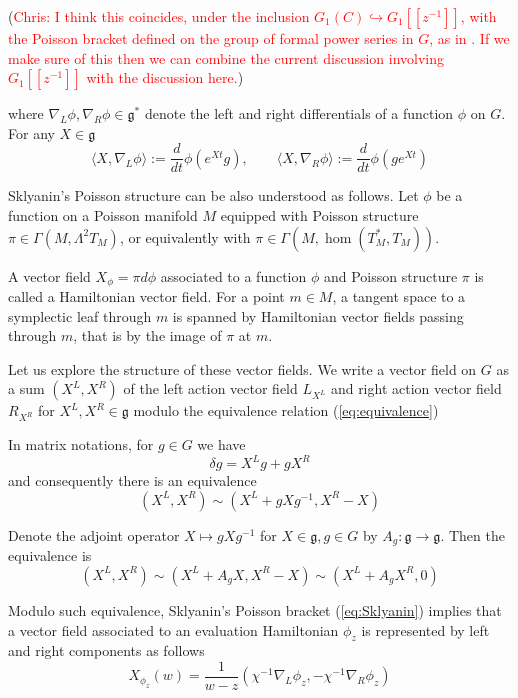 \documentclass[11pt, oneside, reqno]{amsart}
\theoremstyle{definition} \newtheorem{definition}{Definition}[section]
\theoremstyle{definition} \newtheorem{remark}[definition]{Remark}
\theoremstyle{definition} \newtheorem{remarks}[definition]{Remarks}
\theoremstyle{definition} \newtheorem{question}[definition]{Question}
\theoremstyle{definition} \newtheorem*{note}{Note}
\theoremstyle{definition} \newtheorem{example}[definition]{Example}
\theoremstyle{definition} \newtheorem{examples}[definition]{Examples}
\renewcommand{\gg}{\mathfrak{g}}
\newcommand{\inj}{\hookrightarrow}
\newcommand{\chris}[1]{(\textcolor{red}{Chris: #1})}
\begin{document}
\chris{I think this coincides, under the inclusion $G_1(C) \inj G_1[[z^{-1}]]$, with the Poisson bracket defined on the group of formal power series in $G$, as in \cite[Theorem 3.10]{Williams}.  If we make sure of this then we can combine the current discussion involving $G_1[[z^{-1}]]$ with the discussion here.}

where $\nabla_{L}\phi , \nabla_{R}\phi \in \gg^{*} $ denote the left and right differentials
of a function $\phi$ on $G$. For any $X \in \gg$
\begin{equation}
  \langle X, \nabla_{L} \phi \rangle := \frac{d}{dt} \phi(e^{Xt} g),
  \qquad \langle X, \nabla_{R} \phi \rangle := \frac{d}{dt} \phi(g e^{Xt})
\end{equation}

Sklyanin's Poisson structure can be also understood as follows. Let $\phi$ be a function
on a Poisson manifold $M$ equipped with Poisson structure $\pi \in \Gamma(M,\Lambda^2 T_{M})$,
or equivalently with $\pi \in \Gamma(M, \hom (T_{M}^{*}, T_{M}))$. 

A vector field $X_{\phi} = \pi d \phi $ associated to a function $\phi$ and Poisson structure $\pi$ is called a Hamiltonian vector field. For a point $m \in M$, a tangent space to a symplectic
leaf through $m$ is spanned by Hamiltonian vector fields passing through $m$, 
that is by the image of $\pi$ at $m$.

Let us explore the structure of these vector fields. We write a vector field on $G$
as a sum  $(X^L, X^R)$  of the left action vector field $L_{X^L}$ and right action vector field $R_{X^R}$
for $X^L, X^R \in \gg$ modulo the equivalence relation (\ref{eq:equivalence})

In matrix notations, for $g \in G$ we have
\begin{equation}
  \delta g = X^L g + g X^R 
\end{equation}
and consequently there is an equivalence 
\begin{equation}
\label{eq:equivalence0}
  (X^L, X^R) \sim (X^L + g X g^{-1}, X^R -  X)
\end{equation}

Denote the adjoint operator $X \mapsto g X g^{-1}$ for $X \in \gg, g \in G$ by $A_{g}: \gg \to \gg$.
Then the equivalence is
\begin{equation}
\label{eq:equivalence}
    (X^L, X^R) \sim (X^L + A_{g} X , X^{R} -  X) \sim (X^{L} +  A_{g} X^{R}, 0) 
\end{equation}


Modulo such equivalence, Sklyanin's Poisson bracket (\ref{eq:Sklyanin}) implies
that a vector field associated to an evaluation Hamiltonian $\phi_z$ is represented by
left and right components as follows 
\begin{equation}
\label{eq:Xphiz}
X_{\phi_z} (w) =  \frac{1}{w - z} ( \chi^{-1} \nabla_{L} \phi_z,  - \chi^{-1}\nabla_{R} \phi_{z})
\end{equation}
\end{document}
